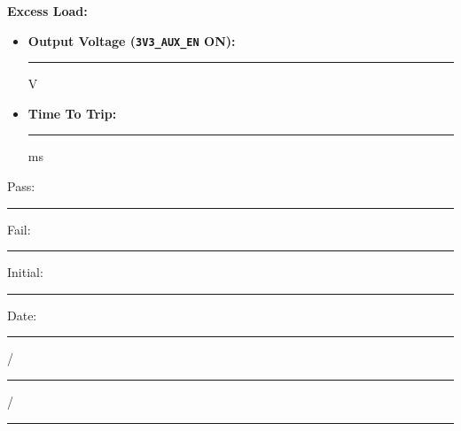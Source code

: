 \textbf{Excess Load:}\\
\begin{itemize}
\item \textbf{Output Voltage (\texttt{3V3\_AUX\_EN} ON):} \rule{3cm}{0.15mm} V
\item \textbf{Time To Trip:} \rule{3cm}{0.15mm} ms
\end{itemize}



\vfill
{\large Pass: \rule{1cm}{0.15mm} \hspace{1cm} Fail: \rule{1cm}{0.15mm}} \hfill Initial: \rule{2cm}{0.15mm} \hspace{1cm} Date: \rule{0.5cm}{0.15mm}/\rule{0.5cm}{0.15mm}/\rule{1cm}{0.15mm}\\[5pt]